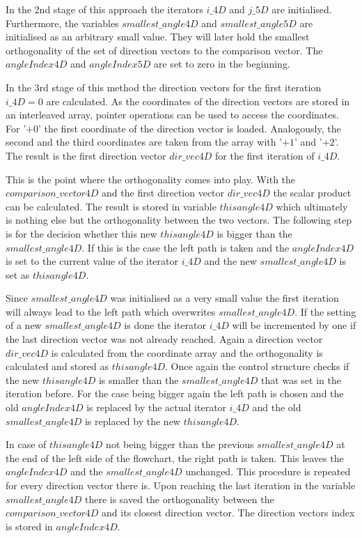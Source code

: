In the 2nd stage of this approach the iterators $i\_4D$ and $j\_5D$ are initialised. Furthermore, the variables $smallest\_angle4D$ and $smallest\_angle5D$ are initialised as an arbitrary small value. They will later hold the smallest orthogonality of the set of direction vectors to the comparison vector. The $angleIndex4D$ and $angleIndex5D$ are set to zero in the beginning. 

In the 3rd stage of this method the direction vectors for the first iteration $i\_4D = 0$ are calculated. As the coordinates of the direction vectors are stored in an interleaved array, pointer operations can be used to access the coordinates. For '$+0$' the first coordinate of the direction vector is loaded. Analogously, the second and the third coordinates are taken from the array with '$+1$' and '$+2$'. The result is the first direction vector $dir\_vec4D$ for the first iteration of $i\_4D$.

This is the point where the orthogonality comes into play. With the $comparison\_vector4D$ and the first direction vector $dir\_vec4D$ the scalar product can be calculated. The result is stored in variable $thisangle4D$ which ultimately is nothing else but the orthogonality between the two vectors. The following step is for the decision whether this new $thisangle4D$ is bigger than the $smallest\_angle4D$. If this is the case the left path is taken and the $angleIndex4D$ is set to the current value of the iterator $i\_4D$ and the new $smallest\_angle4D$ is set as $thisangle4D$.

Since $smallest\_angle4D$ was initialised as a very small value the first iteration will always lead to the left path which overwrites $smallest\_angle4D$. If the setting of a new $smallest\_angle4D$ is done the iterator $i\_4D$ will be incremented by one if the last direction vector was not already reached.
Again a direction vector $dir\_vec4D$ is calculated from the coordinate array and the orthogonality is calculated and stored as $thisangle4D$. Once again the control structure checks if the new $thisangle4D$ is smaller than the $smallest\_angle4D$ that was set in the iteration before. For the case being bigger again the left path is chosen and the old $angleIndex4D$ is replaced by the actual iterator $i\_4D$ and the old $smallest\_angle4D$ is replaced by the new $thisangle4D$. 

In case of $thisangle4D$ not being bigger than the previous $smallest\_angle4D$ at the end of the left side of the flowchart, the right path is taken. This leaves the $angleIndex4D$ and the $smallest\_angle4D$ unchanged.
This procedure is repeated for every direction vector there is. Upon reaching the last iteration in the variable  $smallest\_angle4D$ there is saved the orthogonality between the $comparison\_vector4D$ and its closest direction vector. The direction vectors index is stored in $angleIndex4D$. 

